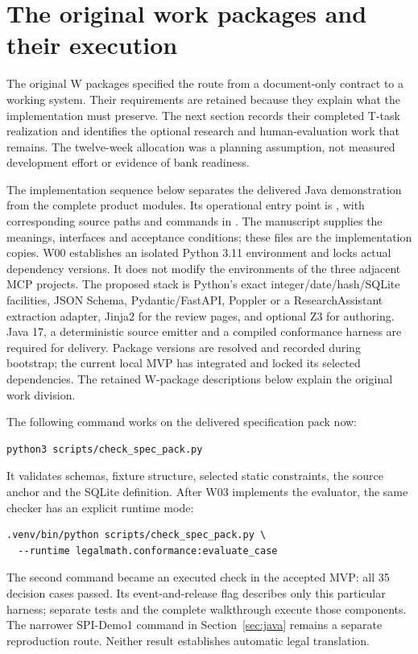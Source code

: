 \documentclass[12pt,a4paper,oneside,openany]{book}
\begin{document}
\section{The original work packages and their execution}

The original W packages specified the route from a document-only contract to
a working system. Their requirements are retained because they explain what the
implementation must preserve. The next section records their completed T-task
realization and identifies the optional research and human-evaluation work that
remains. The twelve-week allocation was a planning assumption, not measured
development effort or evidence of bank readiness.


\label{merge:P-04-prototype:02}


The implementation sequence below separates the delivered Java demonstration
from the complete product modules. Its operational entry point is
, with corresponding source paths and
commands in . The manuscript supplies the meanings,
interfaces and acceptance conditions; these files are the implementation copies.
W00 establishes an isolated
Python 3.11 environment and locks actual dependency versions. It does not modify
the environments of the three adjacent MCP projects. The proposed stack is
Python's exact integer/date/hash/SQLite facilities, JSON Schema, Pydantic/FastAPI,
Poppler or a ResearchAssistant extraction adapter, Jinja2 for the review pages,
and optional Z3 for authoring. Java 17, a deterministic source emitter and a
compiled conformance harness are required for delivery. Package versions are resolved and recorded during bootstrap;
the current local MVP has integrated and locked its selected dependencies.
The retained W-package descriptions below explain the original work division.

The following command works on the delivered specification pack now:
\begin{lstlisting}
python3 scripts/check_spec_pack.py
\end{lstlisting}
It validates schemas, fixture structure, selected static constraints, the source
anchor and the SQLite definition. After W03 implements the evaluator, the same
checker has an explicit runtime mode:
\begin{lstlisting}
.venv/bin/python scripts/check_spec_pack.py \
  --runtime legalmath.conformance:evaluate_case
\end{lstlisting}
The second command became an executed check in the accepted MVP: all 35
decision cases passed. Its event-and-release flag describes only this particular
harness; separate tests and the complete walkthrough execute those components.
The narrower SPI-Demo1 command in Section~\ref{sec:java} remains a separate
reproduction route. Neither result establishes automatic legal translation.
\end{document}
